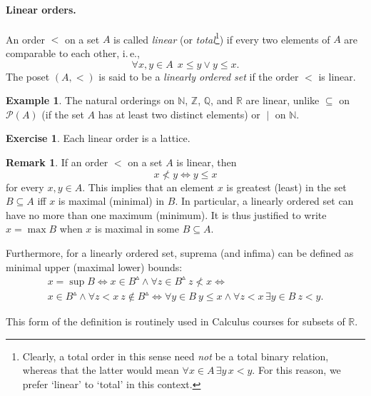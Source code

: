 \documentclass[12pt,notitlepage]{article}
\theoremstyle{plain}
\theoremstyle{definition}
\newtheorem{exc}[thm]{Exercise}
\newtheorem{exm}[thm]{Example}
\newtheorem{rem}[thm]{Remark}
\theoremstyle{plain}
\newcommand{\N}{\mathbb{N}}
\newcommand{\Z}{\mathbb{Z}}
\newcommand{\Q}{\mathbb{Q}}
\newcommand{\R}{\mathbb{R}}
\newcommand{\sbs}{\subseteq}
\newcommand{\mP}{\mathcal{P}}
\newcommand{\1}{\mathbf{1}}
\newcommand{\0}{\mathbf{0}}
\newcommand{\dvd}{\mathop{\mid}}
\newcommand{\mcomm}[1]{}
\begin{document}
\paragraph{Linear orders.} An order ${<}$ on a set $A$ is called \emph{linear} (or \emph{total}\footnote{Clearly, a total order in this sense need \emph{not} be a total binary relation, whereas that the latter would mean $\forall x \in A\, \exists y\, x < y$. For this reason, we prefer `linear' to `total' in this context.}) if every two elements of $A$ are comparable to each other, i.\,e.,
$$\forall x, y \in A\ \ x \leq y \vee y \leq x.$$
The poset $(A,<)$ is said to be a \emph{linearly ordered set} if the order ${<}$ is linear.

\begin{exm}
The natural orderings on $\N$, $\Z$, $\Q$, and $\R$ are linear, unlike ${\sbs}$ on $\mP (A)$ (if the set $A$ has at least two distinct elements) or ${\dvd}$ on $\N$.
\end{exm}

\begin{exc}
Each linear order is a lattice.
\end{exc}

\begin{rem}
If an order ${<}$ on a set $A$ is linear, then
$$x \nless y \iff y \leq x$$
for every $x, y \in A$. This implies that an element $x$ is greatest (least) in the set $B \sbs A$ iff $x$ is maximal (minimal) in $B$. In particular, a linearly ordered set can have no more than one maximum (minimum). It is thus justified to write $x = \max B$ when $x$ is maximal in some $B \sbs A$.

\mcomm{It is important to show the students that `our' supremum is just a general version of what they may have come across in their Calculus course.}

Furthermore, for a linearly ordered set, suprema (and infima) can be defined as minimal upper (maximal lower) bounds:
\begin{multline*}
x = \sup B \iff  x \in B^\vartriangle \wedge \forall z \in B^\vartriangle\ z \nless x \iff\\
 x \in B^\vartriangle \wedge \forall z < x\ z \notin B^\vartriangle \iff
 \forall y\in B\ y \leq x \wedge \forall z < x\, \exists y \in B\ z < y.
\end{multline*}
\end{rem}
\noindent This form of the definition is routinely used in Calculus courses for subsets of $\R$.

\end{document}
